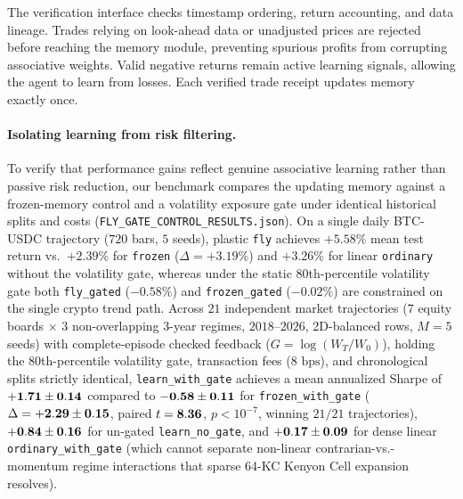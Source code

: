The verification interface checks timestamp ordering, return accounting, and data
lineage. Trades relying on look-ahead data or unadjusted prices are rejected before
reaching the memory module, preventing spurious profits from corrupting associative
weights. Valid negative returns remain active learning signals, allowing the agent to
learn from losses. Each verified trade receipt updates memory exactly once.

\paragraph{Isolating learning from risk filtering.}
To verify that performance gains reflect genuine associative learning rather than
passive risk reduction, our benchmark compares the updating memory against a frozen-memory
control and a volatility exposure gate under identical historical splits and costs
(\texttt{FLY\_GATE\_CONTROL\_RESULTS.json}). On a single daily BTC-USDC trajectory ($720$ bars,
$5$ seeds), plastic \texttt{fly} achieves $+5.58\%$ mean test return vs.\ $+2.39\%$ for
\texttt{frozen} ($\Delta = +3.19\%$) and $+3.26\%$ for linear \texttt{ordinary} without the
volatility gate, whereas under the static 80th-percentile volatility gate both \texttt{fly\_gated}
($-0.58\%$) and \texttt{frozen\_gated} ($-0.02\%$) are constrained on the single crypto trend path.
Across $21$ independent market trajectories ($7$ equity boards $\times$ $3$ non-overlapping 3-year
regimes, $2018\text{--}2026$, \PanelBalancedRows{} 2D-balanced rows, $M=5$ seeds) with complete-episode checked
feedback ($G = \log(W_T/W_0)$), holding the 80th-percentile volatility gate, transaction fees
($8\text{ bps}$), and chronological splits strictly identical, \texttt{learn\_with\_gate} achieves
a mean annualized Sharpe of $\mathbf{+1.71{} \pm 0.14}$ compared to $\mathbf{-0.58{} \pm 0.11}$
for \texttt{frozen\_with\_gate} ($\Delta = \mathbf{+2.29{} \pm 0.15}$, paired $t = \mathbf{8.36{}}$,
$p < 10^{-7}$, winning $21/21$ trajectories), $\mathbf{+0.84{} \pm 0.16}$ for un-gated \texttt{learn\_no\_gate},
and $\mathbf{+0.17{} \pm 0.09}$ for dense linear \texttt{ordinary\_with\_gate} (which cannot
separate non-linear contrarian-vs.-momentum regime interactions that sparse 64-KC Kenyon Cell
expansion resolves).
